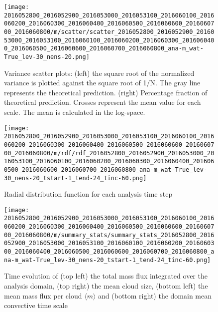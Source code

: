 \documentclass[a4paper, 12pt]{article}
\begin{document}
\begin{figure}[ht] \label{fig:comp_scatter}
\noindent \centering
\texttt{[image: 2016052800\_2016052900\_2016053000\_2016053100\_2016060100\_2016060200\_2016060300\_2016060400\_2016060500\_2016060600\_2016060700\_2016060800/m/scatter/scatter\_2016052800\_2016052900\_2016053000\_2016053100\_2016060100\_2016060200\_2016060300\_2016060400\_2016060500\_2016060600\_2016060700\_2016060800\_ana-m\_wat-True\_lev-30\_nens-20.png]}\\
\caption{Variance scatter plots: (left) the square root of the normalized variance is plotted against the square root of 1/N. The gray line represents the theoretical prediction. (right) Percentage fraction of theoretical prediction. Crosses represent the mean value for each scale. The mean is calculated in the log-space.}
\end{figure}

\begin{figure}[ht] \label{fig:comp_rdf}
\noindent \centering
\texttt{[image: 2016052800\_2016052900\_2016053000\_2016053100\_2016060100\_2016060200\_2016060300\_2016060400\_2016060500\_2016060600\_2016060700\_2016060800/m/rdf/rdf\_2016052800\_2016052900\_2016053000\_2016053100\_2016060100\_2016060200\_2016060300\_2016060400\_2016060500\_2016060600\_2016060700\_2016060800\_ana-m\_wat-True\_lev-30\_nens-20\_tstart-1\_tend-24\_tinc-60.png]}\\
\caption{Radial distribution function for each analysis time step}
\end{figure}

\begin{figure}[ht] \label{fig:comp_summary_stats}
\noindent \centering
\texttt{[image: 2016052800\_2016052900\_2016053000\_2016053100\_2016060100\_2016060200\_2016060300\_2016060400\_2016060500\_2016060600\_2016060700\_2016060800/m/summary\_stats/summary\_stats\_2016052800\_2016052900\_2016053000\_2016053100\_2016060100\_2016060200\_2016060300\_2016060400\_2016060500\_2016060600\_2016060700\_2016060800\_ana-m\_wat-True\_lev-30\_nens-20\_tstart-1\_tend-24\_tinc-60.png]}\\
\caption{Time evolution of (top left) the total mass flux integrated over the analysis domain, (top right) the mean cloud size, (bottom left) the mean mass flux per cloud $\langle m \rangle$ and (bottom right) the domain mean convective time scale}
\end{figure}
\end{document}
